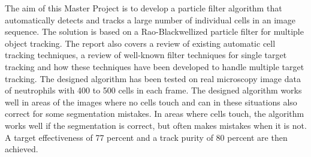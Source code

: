 \begin{small}
\begin{enumerate}
The aim of this Master Project is to develop a particle filter algorithm that automatically detects and tracks a large number of individual cells in an image sequence. The solution is based on a Rao-Blackwellized particle filter for multiple object tracking. The report also covers a review of existing automatic cell tracking techniques, a review of well-known filter techniques for single target tracking and how these techniques have been developed to handle multiple target tracking. The designed algorithm has been tested on real microscopy image data of neutrophils with 400 to 500 cells in each frame. The designed algorithm works well in areas of the images where no cells touch and can in these situations also correct for some segmentation mistakes. In areas where cells touch, the algorithm works well if the segmentation is correct, but often makes mistakes when it is not. A target effectiveness of 77 percent and a track purity of 80 percent are then achieved. 
%
%



\end{enumerate}
\end{small}
%